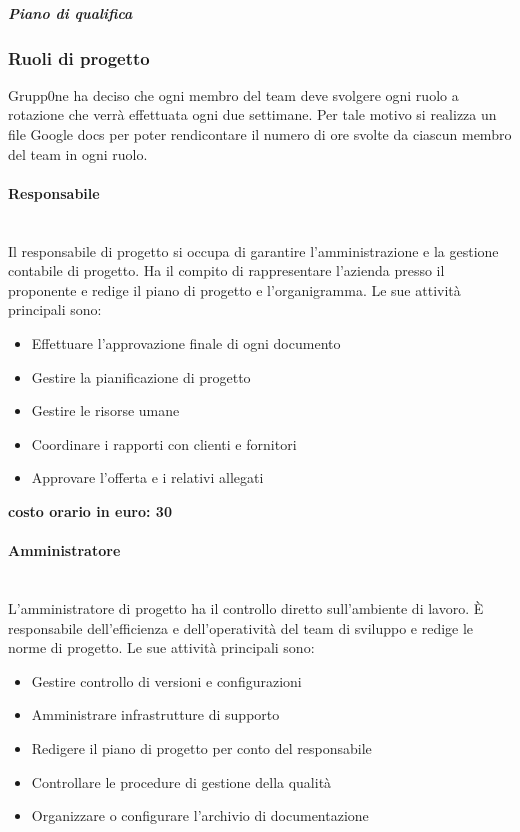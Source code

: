 \documentclass[../norme-di-progetto.tex]{subfiles}
\begin{document}
\subparagraph{Piano di qualifica}%
\label{subp:piano di qualifica}

\subsubsection{Ruoli di progetto}%
\label{subs:ruoli di progetto}

Grupp0ne ha deciso che ogni membro del team deve svolgere ogni ruolo a rotazione che verrà effettuata ogni due settimane.
Per tale motivo si realizza un file Google docs per poter rendicontare il numero di ore svolte da ciascun membro del team in ogni ruolo.

\paragraph{Responsabile}%
\label{par:responsabile}
\\Il responsabile di progetto si occupa di garantire l'amministrazione e la gestione contabile di progetto.
Ha il compito di rappresentare l'azienda presso il proponente e redige il piano di progetto e l'organigramma.
Le sue attività principali sono:

\begin{itemize}
  \item Effettuare l'approvazione finale di ogni documento
  \item Gestire la pianificazione di progetto
  \item Gestire le risorse umane
  \item Coordinare i rapporti con clienti e fornitori
  \item Approvare l'offerta e i relativi allegati
\end{itemize}

\textbf{costo orario in euro: 30}

\paragraph{Amministratore}%
\label{par:amministratore}
\\L'amministratore di progetto ha il controllo diretto sull'ambiente di lavoro. È responsabile dell'efficienza e dell'operatività del team di sviluppo e redige le norme di progetto. Le sue attività principali sono:

\begin{itemize}
  \item Gestire controllo di versioni e configurazioni
  \item Amministrare infrastrutture di supporto
  \item Redigere il piano di progetto per conto del responsabile
  \item Controllare le procedure di gestione della qualità
  \item Organizzare o configurare l'archivio di documentazione
\end{itemize}
\end{document}
